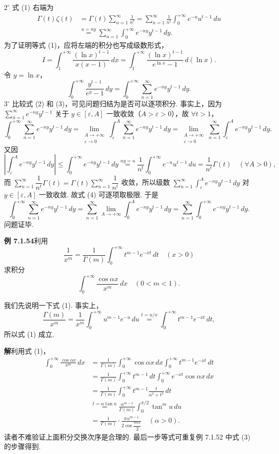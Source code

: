 \documentclass[UTF8,12pt,a4paper,fontset=fandol]{ctexart}
\begin{document}
$2^\circ$ 式 (1) 右端为
\[
\begin{aligned}
\Gamma(t)\zeta(t)
&=\Gamma(t)\sum_{n=1}^{\infty}\frac1{n^t}
=\sum_{n=1}^{\infty}\frac1{n^t}\int_0^{+\infty}e^{-u}u^{t-1}\,du\\
&\overset{u=ny}{=}\sum_{n=1}^{\infty}\int_0^{+\infty}e^{-ny}y^{t-1}\,dy.
\end{aligned}
\tag{2}
\]
为了证明等式 (1)，应将左端的积分也写成级数形式，
\[
I=\int_1^{+\infty}\frac{(\ln x)^{t-1}}{x(x-1)}\,dx
=\int_1^{+\infty}\frac{(\ln x)^{t-1}}{e^{\ln x}-1}\,d(\ln x).
\]
令 $y=\ln x$，
\[
\int_0^{+\infty}\frac{y^{t-1}}{e^y-1}\,dy
=\int_0^{+\infty}\sum_{n=1}^{\infty}e^{-ny}y^{t-1}\,dy.
\tag{3}
\]
$3^\circ$ 比较式 (2) 和 (3)，可见问题归结为是否可以逐项积分. 事实上，因为 $\sum\limits_{n=1}^{\infty}e^{-ny}y^{t-1}$ 关于 $y\in[\varepsilon,A]$ 一致收敛（$A>\varepsilon>0$），故 $\forall t>1$，
\[
\int_0^{+\infty}\sum_{n=1}^{\infty}e^{-ny}y^{t-1}\,dy
=\lim_{\substack{A\to+\infty\\ \varepsilon\to0}}\int_{\varepsilon}^{A}\sum_{n=1}^{\infty}e^{-ny}y^{t-1}\,dy
=\lim_{\substack{A\to+\infty\\ \varepsilon\to0}}\sum_{n=1}^{\infty}\int_{\varepsilon}^{A}e^{-ny}y^{t-1}\,dy.
\tag{4}
\]
又因
\[
\left|\int_{\varepsilon}^{A}e^{-ny}y^{t-1}\,dy\right|
\le \int_0^{+\infty}e^{-ny}y^{t-1}\,dy
\overset{ny=u}{=}\frac1{n^t}\int_0^{+\infty}e^{-u}u^{t-1}\,du
=\frac1{n^t}\Gamma(t)\quad(\forall A>0),
\]
而 $\sum\limits_{n=1}^{\infty}\dfrac1{n^t}\Gamma(t)=\Gamma(t)\sum\limits_{n=1}^{\infty}\dfrac1{n^t}$ 收敛，所以级数
$\sum\limits_{n=1}^{\infty}\int_{\varepsilon}^{A}e^{-ny}y^{t-1}\,dy$ 对 $y\in[\varepsilon,A]$ 一致收敛. 故式 (4) 可逐项取极限. 于是
\[
\int_0^{+\infty}\sum_{n=1}^{\infty}e^{-ny}y^{t-1}\,dy
=\sum_{n=1}^{\infty}\lim_{A\to+\infty}\int_0^A e^{-ny}y^{t-1}\,dy
=\sum_{n=1}^{\infty}\int_0^{+\infty}e^{-ny}y^{t-1}\,dy.
\]
问题证毕.

\noindent\textbf{例 7.1.54}\quad 利用
\[
\frac1{x^m}=\frac1{\Gamma(m)}\int_0^{+\infty}t^{m-1}e^{-xt}\,dt\quad(x>0)
\tag{1}
\]
求积分
\[
\int_0^{+\infty}\frac{\cos\alpha x}{x^m}\,dx\quad(0<m<1).
\]

我们先说明一下式 (1). 事实上，
\[
\frac{\Gamma(m)}{x^m}
=\frac1{x^m}\int_0^{+\infty}u^{m-1}e^{-u}\,du
\overset{t=u/x}{=}\int_0^{+\infty}t^{m-1}e^{-xt}\,dt,
\]
所以式 (1) 成立.

\noindent\textbf{解}\quad 利用式 (1)，
\[
\begin{aligned}
\int_0^{+\infty}\frac{\cos\alpha x}{x^m}\,dx
&=\frac1{\Gamma(m)}\int_0^{+\infty}\cos\alpha x\,dx\int_0^{+\infty}t^{m-1}e^{-xt}\,dt\\
&=\frac1{\Gamma(m)}\int_0^{+\infty}t^{m-1}\,dt\int_0^{+\infty}e^{-xt}\cos\alpha x\,dx\\
&=\frac1{\Gamma(m)}\int_0^{+\infty}t^{m-1}\frac{t}{\alpha^2+t^2}\,dt\\
&\overset{t=\alpha\tan u}{=}\frac{\alpha^{m-1}}{\Gamma(m)}
\int_0^{\pi/2}\tan^m u\,du\\
&=\frac1{\Gamma(m)}\cdot\frac{\pi\alpha^{m-1}}{2\cos\dfrac{m\pi}{2}}\quad(\alpha>0).
\end{aligned}
\]
读者不难验证上面积分交换次序是合理的. 最后一步等式可重复例 7.1.52 中式 (3) 的步骤得到.
\end{document}
